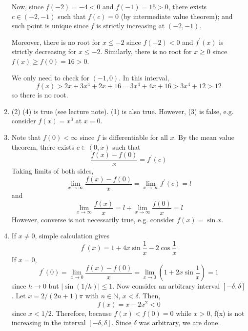 \documentclass[10pt, a4paper, twoside]{report}
\begin{document}
\begin{enumerate}[{1.}]
    Now, since \(f(-2)=-4<0\) and \(f(-1)=15>0\), there exists \(c\in(-2,-1)\) such that \(f(c)=0\) (by intermediate value theorem); and such point is unique since \(f\) is strictly increasing at \((-2,-1)\). 

    Moreover, there is no root for \(x\leq -2\) since \(f(-2)<0\) and \(f^\prime(x)\) is strictly decreasing for \(x\leq -2\). Similarly, there is no root for \(x\geq 0\) since \(f(x)\geq f(0)=16>0\).

    We only need to check for \((-1,0)\). In this interval, 
    \[f(x)>2x+3x^4+2x+16=3x^4+4x+16>3x^4+12>12\]
    so there is no root.
    \item (2) (4) is true (see lecture note). (1) is also true. However, (3) is false, e.g. consider \(f(x)=x^3\) at \(x=0\).
    \item Note that \(f(0)<\infty\) since \(f\) is differentiable for all \(x\). By the mean value theorem, there exists \(c\in(0,x)\) such that 
    \[\frac{f(x)-f(0)}{x}=f^\prime(c)\]
    Taking limits of both sides,
    \[\lim_{x\to\infty}\frac{f(x)-f(0)}{x}=\lim_{x\to\infty}f^\prime(c)=l\]
    and
    \[\lim_{x\to\infty}\frac{f(x)}{x}=l+\lim_{x\to\infty}\frac{f(0)}{x}=l\]
    However, converse is not necessarily true, e.g. consider \(f(x)=\sin x\).
    \item If \(x\neq 0\), simple calculation gives 
    \[f^\prime(x)=1+4x\sin\frac 1x-2\cos\frac 1x\]
    If \(x=0\),
    \[f^\prime(0)=\lim_{x\to 0}\frac{f(x)-f(0)}{x}=\lim_{x\to 0}\left(1+2x\sin\frac 1x\right)=1\]
    since \(h\to 0\) but \(|\sin(1/h)|\leq 1\). Now consider an arbitrary interval \([-\delta,\delta]\). Let \(x=2/(2n+1)\pi\) with \(n\in\mathbb{N}\), \(x<\delta\). Then,
    \[f(x)=x-2x^2<0\]
    since \(x<1/2\). Therefore, because \(f(x)<f(0)=0\) while \(x>0\), f(x) is not increasing in the interval \([-\delta,\delta]\). Since \(\delta\) was arbitrary, we are done.
\end{enumerate}
\end{document}
